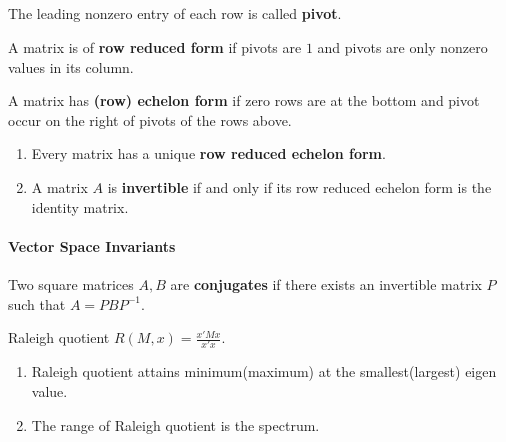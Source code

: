 \subsection{}
\begin{definition}
	The leading nonzero entry of each row is called \textbf{pivot}.
\end{definition}
\begin{definition}
	A matrix is of \textbf{row reduced form} if pivots are $1$ and pivots are only nonzero values in its column.
\end{definition}
\begin{definition}
	A matrix has \textbf{(row) echelon form} if zero rows are at the bottom and pivot occur on the right of pivots of the rows above.
\end{definition}
\begin{enumerate}
	\item Every matrix has a unique \textbf{row reduced echelon form}.
	\item A matrix $A$ is \textbf{invertible} if and only if its row reduced echelon form is the identity matrix.
\end{enumerate}
\paragraph{Vector Space Invariants}
\begin{definition}[conjugation]
	Two square matrices $A,B$ are \textbf{conjugates} if there exists an invertible matrix $P$ such that $A = PBP^{-1}$.
\end{definition}

\begin{definition}
	Raleigh quotient $R(M,x) = \frac{x'Mx}{x'x}$.
\end{definition}
\begin{enumerate}	
	\item Raleigh quotient attains minimum(maximum) at the smallest(largest) eigen value.
	\item The range of Raleigh quotient is the spectrum. 
\end{enumerate}	
